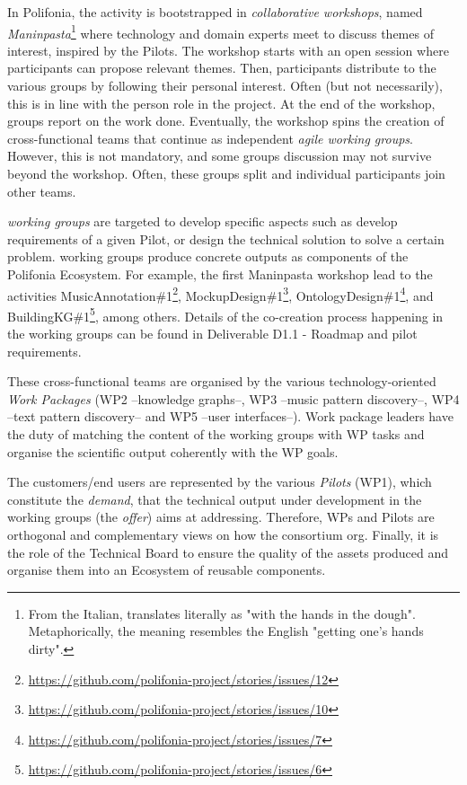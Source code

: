 In Polifonia, the activity is bootstrapped in \textit{collaborative workshops}, named \textit{Maninpasta}\footnote{From the Italian, translates literally as "with the hands in the dough". Metaphorically, the meaning resembles the English "getting one's hands dirty".} where technology and domain experts meet to discuss themes of interest, inspired by the Pilots. 
The workshop starts with an open session where participants can propose relevant themes. 
Then, participants distribute to the various groups by following their personal interest.
Often (but not necessarily), this is in line with the person role in the project.
At the end of the workshop, groups report on the work done. 
Eventually, the workshop spins the creation of cross-functional teams that continue as independent \textit{agile working groups}. However, this is not mandatory, and some groups discussion may not survive beyond the workshop. Often, these groups split and individual participants join other teams.

\textit{working groups} are targeted to develop specific aspects such as develop requirements of a given Pilot, or design the technical solution to solve a certain problem.
working groups produce concrete outputs as components of the Polifonia Ecosystem.
For example, the first Maninpasta workshop lead to the activities MusicAnnotation\#1\footnote{\url{https://github.com/polifonia-project/stories/issues/12}}, MockupDesign\#1\footnote{\url{https://github.com/polifonia-project/stories/issues/10}}, OntologyDesign\#1\footnote{\url{https://github.com/polifonia-project/stories/issues/7}}, and  BuildingKG\#1\footnote{\url{https://github.com/polifonia-project/stories/issues/6}}, among others.
Details of the co-creation process happening in the working groups can be found in Deliverable D1.1 - Roadmap and pilot requirements.

These cross-functional teams are organised by the various technology-oriented \textit{Work Packages} (WP2 --knowledge graphs--, WP3 --music pattern discovery--, WP4 --text pattern discovery-- and WP5 --user interfaces--). 
Work package leaders have the duty of matching the content of the working groups with WP tasks and organise the scientific output coherently with the WP goals.

The customers/end users are represented by the various \textit{Pilots} (WP1), which constitute the \textit{demand}, that the technical output under development in the working groups (the \textit{offer}) aims at addressing. 
Therefore, WPs and Pilots are orthogonal and complementary views on how the consortium org.
Finally, it is the role of the Technical Board to ensure the quality of the assets produced and organise them into an Ecosystem of reusable components.

